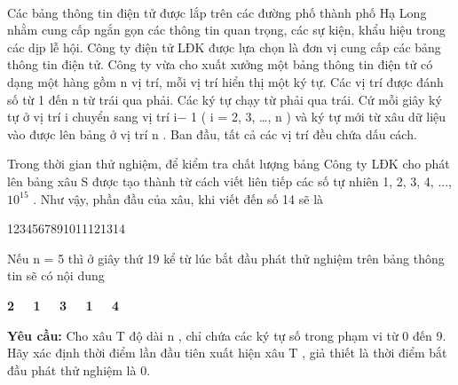  

Các bảng thông tin điện tử được lắp trên các đường phố thành phố Hạ Long nhằm cung cấp ngắn gọn các thông tin quan trọng, các sự kiện, khẩu hiệu trong các dịp lễ hội. Công ty điện tử LĐK được lựa chọn là đơn vị cung cấp các bảng thông tin điện tử. Công ty vừa cho xuất xưởng một bảng thông tin điện tử có dạng một hàng gồm n vị trí, mỗi vị trí hiển thị một ký tự. Các vị trí được đánh số từ 1 đến n từ trái qua phải. Các ký tự chạy từ phải qua trái. Cứ mỗi giây ký tự ở vị trí i chuyển sang vị trí i− 1 ( i = 2, 3, …, n ) và ký tự mới từ xâu dữ liệu vào được lên bảng ở vị trí n . Ban đầu, tất cả các vị trí đều chứa dấu cách.

Trong thời gian thử nghiệm, để kiểm tra chất lượng bảng Công ty LĐK cho phát lên bảng xâu S được tạo thành từ cách viết liên tiếp các số tự nhiên 1, 2, 3, 4, ..., $10^{15}$ . Như vậy, phần đầu của xâu, khi viết đến số 14 sẽ là

1234567891011121314

Nếu n = 5 thì ở giây thứ 19 kể từ lúc bắt đầu phát thử nghiệm trên bảng thông tin sẽ có nội dung

\textbf{2   1   3   1   4 }

\textbf{Yêu cầu: } Cho xâu T độ dài n , chỉ chứa các ký tự số trong phạm vi từ 0 đến 9. Hãy xác định thời điểm lần đầu tiên xuất hiện xâu T , giả thiết là thời điểm bắt đầu phát thử nghiệm là 0.